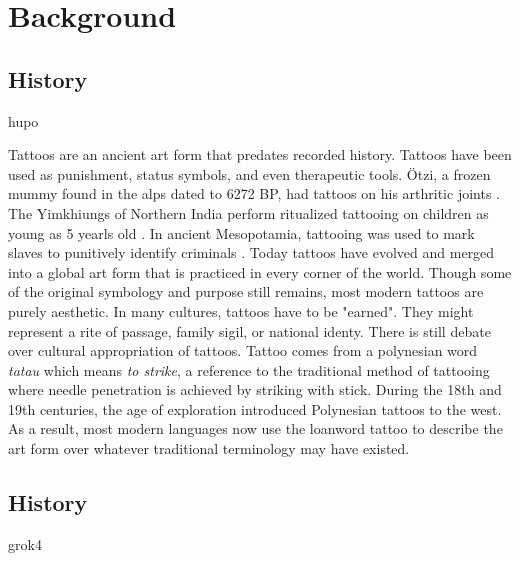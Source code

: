 \documentclass[11pt]{article}
\begin{document}
\section{Background}

\subsection{History}

hupo

Tattoos are an ancient art form that predates recorded history.
Tattoos have been used as punishment, status symbols, and even therapeutic tools.
Ötzi, a frozen mummy found in the alps dated to 6272 BP, had tattoos on his arthritic joints \cite{deterwolf_worlds_oldest}.
The Yimkhiungs of Northern India perform ritualized tattooing on children as young as 5 yearls old \cite{kluger2015cultural}.
In ancient Mesopotamia, tattooing was used to mark slaves to punitively identify criminals \cite{hawken2022tattooing}.
Today tattoos have evolved and merged into a global art form that is practiced in every corner of the world.
Though some of the original symbology and purpose still remains, most modern tattoos are purely aesthetic.
In many cultures, tattoos have to be "earned". They might represent a rite of passage, family sigil, or national identy. There is still debate over cultural appropriation of tattoos.
Tattoo comes from a polynesian word \textit{tatau} which means \textit{to strike}, a reference to the traditional method of tattooing where needle penetration is achieved by striking with stick.
During the 18th and 19th centuries, the age of exploration introduced Polynesian tattoos to the west.
As a result, most modern languages now use the loanword tattoo to describe the art form over whatever traditional terminology may have existed.

\subsection{History}

grok4
\end{document}
